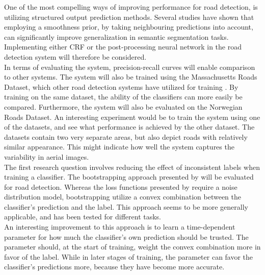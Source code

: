 One of the most compelling ways of improving performance for road detection, is utilizing structured output prediction methods. Several studies \citep{Kluckner_semantic_height} \citep{LeCun_semantic} \citep{Mnih_roads_high_res_aerial_images} have shown that employing a smoothness prior, by taking neighbouring predictions into account, can significantly improve generalization in semantic segmentation tasks. Implementing either \ac{CRF} or the post-processing neural network in the road detection system will therefore be considered.\\

In terms of evaluating the system, precision-recall curves will enable comparison to other systems. The system will also be trained using the Massachusetts Roads Dataset, which other road detection systems have utilized for training \citep{MnihThesis}\citep{saito_building_and_roads}. By training on the same dataset, the ability of the classifiers can more easily be compared. Furthermore, the system will also be evaluated on the Norwegian Roads Dataset. An interesting experiment would be to train the system using one of the datasets, and see what performance is achieved by the other dataset. The datasets contain two very separate areas, but also depict roads with relatively similar appearance. This might indicate how well the system captures the variability in aerial images. \\

The first research question involves reducing the effect of inconsistent labels when training a classifier. The bootstrapping approach presented by \cite{Reed_noisy_labels_bootstrapping} will be evaluated for road detection. Whereas the loss functions presented by \citep{Mnih_aerial_images_noisy} require a noise distribution model,  bootstrapping utilize a   convex combination between the classifier's prediction and the label. This approach seems to be more generally applicable, and has been tested for different tasks.\\

 An interesting improvement to this approach is to learn a time-dependent parameter for how much the classifier's own prediction should be trusted. The parameter should, at the start of training, weight the convex combination more in favor of the label. While in later stages of training, the parameter can favor the classifier's predictions more, because they have become more accurate.\\

